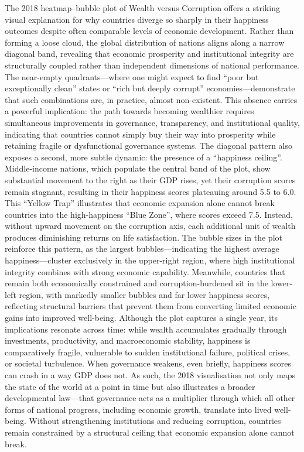 \documentclass[conference]{IEEEtran}
\begin{document}
The 2018 heatmap–bubble plot of Wealth versus Corruption offers a striking visual explanation for why countries diverge so sharply in their happiness outcomes despite often comparable levels of economic development. Rather than forming a loose cloud, the global distribution of nations aligns along a narrow diagonal band, revealing that economic prosperity and institutional integrity are structurally coupled rather than independent dimensions of national performance. The near-empty quadrants—where one might expect to find “poor but exceptionally clean” states or “rich but deeply corrupt” economies—demonstrate that such combinations are, in practice, almost non-existent. This absence carries a powerful implication: the path towards becoming wealthier requires simultaneous improvements in governance, transparency, and institutional quality, indicating that countries cannot simply buy their way into prosperity while retaining fragile or dysfunctional governance systems. The diagonal pattern also exposes a second, more subtle dynamic: the presence of a “happiness ceiling”. Middle-income nations, which populate the central band of the plot, show substantial movement to the right as their GDP rises, yet their corruption scores remain stagnant, resulting in their happiness scores plateauing around 5.5 to 6.0. This “Yellow Trap” illustrates that economic expansion alone cannot break countries into the high-happiness “Blue Zone”, where scores exceed 7.5. Instead, without upward movement on the corruption axis, each additional unit of wealth produces diminishing returns on life satisfaction. The bubble sizes in the plot reinforce this pattern, as the largest bubbles—indicating the highest average happiness—cluster exclusively in the upper-right region, where high institutional integrity combines with strong economic capability. Meanwhile, countries that remain both economically constrained and corruption-burdened sit in the lower-left region, with markedly smaller bubbles and far lower happiness scores, reflecting structural barriers that prevent them from converting limited economic gains into improved well-being. Although the plot captures a single year, its implications resonate across time: while wealth accumulates gradually through investments, productivity, and macroeconomic stability, happiness is comparatively fragile, vulnerable to sudden institutional failure, political crises, or societal turbulence. When governance weakens, even briefly, happiness scores can crash in a way GDP does not. As such, the 2018 visualisation not only maps the state of the world at a point in time but also illustrates a broader developmental law—that governance acts as a multiplier through which all other forms of national progress, including economic growth, translate into lived well-being. Without strengthening institutions and reducing corruption, countries remain constrained by a structural ceiling that economic expansion alone cannot break.
\end{document}
